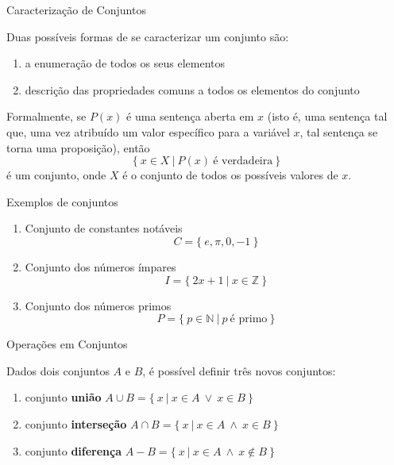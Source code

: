 \begin{frame}[fragile]{Caracterização de Conjuntos}

Duas possíveis formas de se caracterizar um conjunto são:

\begin{enumerate}
    \item a enumeração de todos os seus elementos
    \item descrição das propriedades comuns a todos os elementos do conjunto
\end{enumerate}


\vspace{0.2in}
Formalmente, se $P(x)$ é uma sentença aberta em $x$ (isto é, uma sentença tal que, uma vez atribuído um valor específico para a variável $x$, tal sentença se torna uma proposição), então
\[
    \{\ x\in X\ |\ P(x)\ \mbox{é verdadeira}\ \}
\]
é um conjunto, onde $X$ é o conjunto de  todos os possíveis valores de $x$.

\end{frame}

\begin{frame}[fragile]{Exemplos de conjuntos}

    \begin{enumerate}
        \item Conjunto de constantes notáveis
$$
    C = \{\ e, \pi, 0, -1\ \}
$$

        \item Conjunto dos números ímpares
$$
    I = \{\ 2x + 1 \ |\ x\in \mathbb{Z}\ \}
$$

        \item Conjunto dos números primos
$$
    P = \{\ p\in \mathbb{N}\ |\ p\ \mbox{é primo}\ \}
$$
    \end{enumerate}

\end{frame}

\begin{frame}[fragile]{Operações em Conjuntos}

Dados dois conjuntos $A$ e $B$, é possível definir três novos conjuntos:

    \begin{enumerate}
        \item conjunto \textbf{união} $A \cup B = \{\ x\ |\ x \in A\  \lor\  x\in B\ \}$
        \item conjunto \textbf{interseção} $A \cap B = \{\ x \ |\ x \in A\  \land\  x \in B\ \}$
        \item conjunto \textbf{diferença} $A - B = \{\ x\ |\ x \in A\ \land\ x \not\in B\ \}$
    \end{enumerate}

\end{frame}


